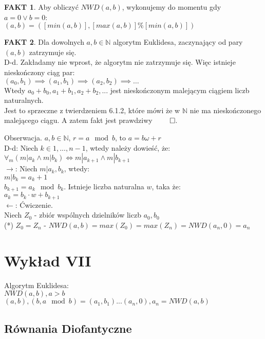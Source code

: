 \documentclass{article}
\theoremstyle{definition}
\theoremstyle{definition}
\theoremstyle{definition}
\theoremstyle{definition}
\newtheorem*{fakt}{FAKT}
\begin{document}
\begin{fakt}
    Aby obliczyć $NWD(a,b)$, wykonujemy do momentu gdy $a=0 \lor b=0$:\\
    $(a,b)=([min(a,b)],[max(a,b)] \% [min(a,b)])$
\end{fakt}

\begin{fakt}
    Dla dowolnych $a,b\in\mathbb{N}$ algorytm Euklidesa, 
    zaczynający od pary $(a,b)$ zatrzymuje się.\\
    D-d. Zakładamy nie wprost, że algorytm nie zatrzymuje się. 
    Więc istnieje nieskończony ciąg par:\\
    $(a_0,b_1)\implies(a_1,b_1)\implies(a_2,b_2)\implies\dots$\\
    Wtedy $a_0+b_0, a_1+b_1, a_2+b_2, ...$ jest nieskończonym malejącym ciągiem liczb naturalnych.\\
    Jest to sprzeczne z twierdzeniem 6.1.2, które mówi że w $\mathbb{N}$ nie ma nieskończonego malejącego ciągu.
    A zatem fakt jest prawdziwy $\qed$.
\end{fakt}

Obserwacja. $a,b\in\mathbb{N}$, $r=a \mod b$, to $a=b\omega + r$\\
D-d: Niech $k\in{1,...,n-1}$, wtedy należy dowieść, że:\\
$\forall_{m} (m|a_k \land m| b_k) \iff m|a_{k+1} \land m|b_{k+1}$\\
$\rightarrow$: Niech $m|a_k,b_k$, wtedy:\\
$m|b_k=a_k+1$\\
$b_{k+1}=a_k\mod b_k$. Istnieje liczba naturalna $w$, taka że:\\
$a_k=b_k\cdot w + b_{k+1}$\\
$\leftarrow$: Ćwiczenie.\\

Niech $Z_0$ - zbiór wspólnych dzielników liczb $a_0,b_0$\\
(*) $Z_0=Z_n$ - $NWD(a,b)=max(Z_0)=max(Z_n)=NWD(a_n,0)=a_n$


\section{Wykład VII}

Algorytm Euklidesa:\\
$NWD(a,b), a>b$\\
$(a,b),(b, a \mod b)=(a_1,b_1)...(a_n,0), a_n=NWD(a,b)$

\subsection{Równania Diofantyczne}
\end{document}
